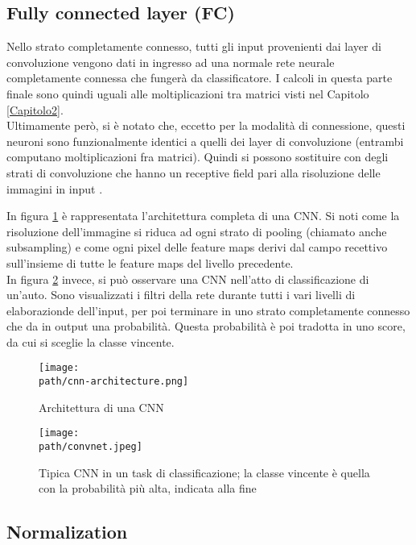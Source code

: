 \subsection{Fully connected layer (FC)}
Nello strato completamente connesso, tutti gli input provenienti dai layer di convoluzione vengono dati in ingresso ad una normale rete neurale completamente connessa che fungerà da classificatore. I calcoli in questa parte finale sono quindi uguali alle moltiplicazioni tra matrici visti nel Capitolo \ref{Capitolo2}. \\
Ultimamente però, si è notato che, eccetto per la modalità di connessione, questi neuroni sono funzionalmente identici a quelli dei layer di convoluzione (entrambi computano moltiplicazioni fra matrici). Quindi si possono sostituire con degli strati di convoluzione che hanno un receptive field pari alla risoluzione delle immagini in input \parencite{WCS231layer}. 

In figura \ref{fig:cnn4} è rappresentata l'architettura completa di una CNN. Si noti come la risoluzione dell'immagine si riduca ad ogni strato di pooling (chiamato anche subsampling) e come ogni pixel delle feature maps derivi dal campo recettivo sull'insieme di tutte le feature maps del livello precedente. \\
In figura \ref{fig:cnn3} invece, si può osservare una CNN nell'atto di classificazione di un'auto. Sono visualizzati i filtri della rete durante tutti i vari livelli di elaborazionde dell'input, per poi terminare in uno strato completamente connesso che da in output una probabilità. Questa probabilità è poi tradotta in uno score, da cui si sceglie la classe vincente. 
\begin{figure}[h!]
 \centering
 \texttt{[image: \\path/cnn-architecture.png]} 
 \caption{Architettura di una CNN}
 \label{fig:cnn4}
\end{figure}

\begin{figure}[h!]
 \centering
 \texttt{[image: \\path/convnet.jpeg]} 
 \caption{Tipica CNN in un task di classificazione; la classe vincente è quella con la probabilità più alta, indicata alla fine}
 \label{fig:cnn3}
\end{figure}

\subsection{Normalization}

